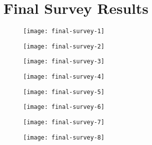 \chapter{Final Survey Results} \label{appendix:final-survey}

\begin{figure}[hbt]
  \centering
  \texttt{[image: final-survey-1]}
\end{figure}

\begin{figure}[hbt]
  \centering
  \texttt{[image: final-survey-2]}
\end{figure}

\begin{figure}[hbt]
  \centering
  \texttt{[image: final-survey-3]}
\end{figure}

\begin{figure}[hbt]
  \centering
  \texttt{[image: final-survey-4]}
\end{figure}

\begin{figure}[hbt]
  \centering
  \texttt{[image: final-survey-5]}
\end{figure}

\begin{figure}[hbt]
  \centering
  \texttt{[image: final-survey-6]}
\end{figure}

\begin{figure}[hbt]
  \centering
  \texttt{[image: final-survey-7]}
\end{figure}

\begin{figure}[hbt]
  \centering
  \texttt{[image: final-survey-8]}
\end{figure}
